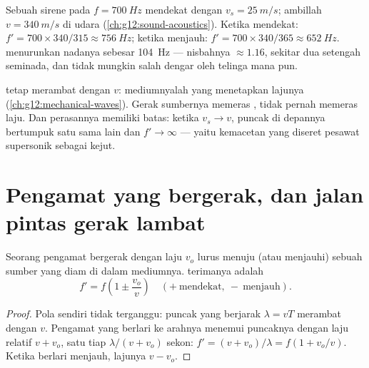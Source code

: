 \begin{example}\label{ex:g12:doppler-effect:siren}
Sebuah sirene pada $f = \qty{700}{Hz}$ mendekat dengan $v_s = \qty{25}{m/s}$; ambillah
$v = \qty{340}{m/s}$ di udara (\cref{ch:g12:sound-acoustics}). Ketika mendekat:
$f' = 700 \times 340/315 \approx \qty{756}{Hz}$; ketika menjauh:
$f' = 700 \times 340/365 \approx \qty{652}{Hz}$.  menurunkan nadanya sebesar
\qty{104}{Hz} --- nisbahnya $\approx 1.16$, sekitar dua setengah seminada, dan tidak
mungkin salah dengar oleh telinga mana pun.
\end{example}

\begin{remark}\label{rem:g12:doppler-effect:speed-unchanged}
 tetap merambat dengan $v$: mediumnyalah yang menetapkan lajunya
(\cref{ch:g12:mechanical-waves}). Gerak sumbernya memeras \emph{}, tidak
pernah memeras laju. Dan perasannya memiliki batas: ketika $v_s \to v$, puncak di depannya
bertumpuk satu sama lain dan $f' \to \infty$ --- yaitu kemacetan  yang
diseret pesawat supersonik sebagai  kejut.
\end{remark}

\section{Pengamat yang bergerak, dan jalan pintas gerak lambat}

\begin{proposition}\label{prop:g12:doppler-effect:moving-observer}
Seorang pengamat bergerak dengan laju $v_o$ lurus menuju (atau menjauhi) sebuah sumber
yang diam di dalam mediumnya.  terimanya adalah
\[ f' = f\left(1 \pm \frac{v_o}{v}\right) \quad (+\ \text{mendekat},\ -\ \text{menjauh}). \]
\end{proposition}

\begin{proof}
Pola  sendiri tidak terganggu: puncak yang berjarak $\lambda = vT$ merambat
dengan $v$. Pengamat yang berlari ke arahnya menemui puncaknya dengan laju relatif
$v + v_o$, satu tiap $\lambda/(v + v_o)$ sekon: $f' = (v + v_o)/\lambda = f(1 + v_o/v)$.
Ketika berlari menjauh, lajunya $v - v_o$.
\end{proof}

